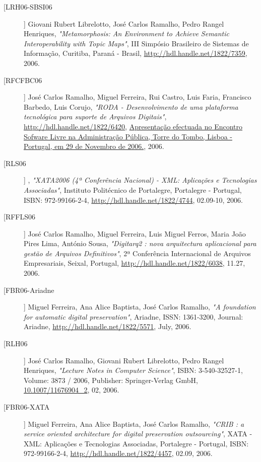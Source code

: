 \begin{description}
\item[[LRH06-SBSI06]]
    \textsf{Giovani Rubert Librelotto, José Carlos Ramalho, Pedro Rangel Henriques}, \emph{"Metamorphosis: An Environment to Achieve Semantic Interoperability with Topic Maps"}, III Simpósio Brasileiro de Sistemas de Informação, Curitiba, Paraná - Brasil, \url{http://hdl.handle.net/1822/7359}, 2006.

\item[[RFCFBC06]]
    \textsf{José Carlos Ramalho, Miguel Ferreira, Rui Castro, Luis Faria, Francisco Barbedo, Luis Corujo}, \emph{"RODA - Desenvolvimento de uma plataforma tecnológica para suporte de Arquivos Digitais"}, \url{http://hdl.handle.net/1822/6420}, \url{Apresentação efectuada no Encontro Sofware Livre na Administração Pública, Torre do Tombo, Lisboa - Portugal, em 29 de Novembro de 2006.}, 2006.

\item[[RLS06]]
    \textsf{}, \emph{"XATA2006 (4ª Conferência Nacional) - XML: Aplicações e Tecnologias Associadas"}, Instituto Politécnico de Portalegre, Portalegre - Portugal, ISBN: 972-99166-2-4, \url{http://hdl.handle.net/1822/4744}, 02.09-10, 2006.

\item[[RFFLS06]]
    \textsf{José Carlos Ramalho, Miguel Ferreira, Luis Miguel Ferros, Maria João Pires Lima, António Sousa}, \emph{"Digitarq2 : nova arquitectura aplicacional para gestão de Arquivos Definitivos"}, 2ª Conferência Internacional de Arquivos Empresariais, Seixal, Portugal, \url{http://hdl.handle.net/1822/6038}, 11.27, 2006.

\item[[FBR06-Ariadne]]
    \textsf{Miguel Ferreira, Ana Alice Baptista, José Carlos Ramalho}, \emph{"A foundation for automatic digital preservation"}, Ariadne, ISSN: 1361-3200, Journal: Ariadne, \url{http://hdl.handle.net/1822/5571}, July, 2006.

\item[[RLH06]]
    \textsf{José Carlos Ramalho, Giovani Rubert Librelotto, Pedro Rangel Henriques}, \emph{"Lecture Notes in Computer Science"}, ISBN: 3-540-32527-1, Volume: 3873 / 2006, Publisher: Springer-Verlag GmbH, \url{10.1007/11676904_2}, 02, 2006.

\item[[FBR06-XATA]]
    \textsf{Miguel Ferreira, Ana Alice Baptista, José Carlos Ramalho}, \emph{"CRIB : a service oriented architecture for digital preservation outsourcing"}, XATA - XML: Aplicações e Tecnologias Associadas, Portalegre - Portugal, ISBN: 972-99166-2-4, \url{http://hdl.handle.net/1822/4457}, 02.09, 2006.


\end{description}
